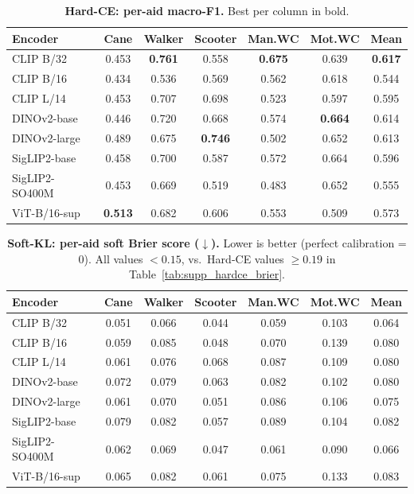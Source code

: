 \documentclass[conference]{IEEEtran}
\begin{document}
\begin{table}[!t]
\caption{\textbf{Hard-CE: per-aid macro-F1.} Best per column in bold.}
\label{tab:supp_hardce_f1}
\centering\scriptsize
\setlength{\tabcolsep}{4pt}
\begin{tabular}{@{}lcccccc@{}}
\toprule
\textbf{Encoder} & \textbf{Cane} & \textbf{Walker} & \textbf{Scooter} & \textbf{Man.WC} & \textbf{Mot.WC} & \textbf{Mean} \\
\midrule
CLIP B/32      & 0.453 & \textbf{0.761} & 0.558 & \textbf{0.675} & 0.639 & \textbf{0.617} \\
CLIP B/16      & 0.434 & 0.536 & 0.569 & 0.562 & 0.618 & 0.544 \\
CLIP L/14      & 0.453 & 0.707 & 0.698 & 0.523 & 0.597 & 0.595 \\
DINOv2-base    & 0.446 & 0.720 & 0.668 & 0.574 & \textbf{0.664} & 0.614 \\
DINOv2-large   & 0.489 & 0.675 & \textbf{0.746} & 0.502 & 0.652 & 0.613 \\
SigLIP2-base   & 0.458 & 0.700 & 0.587 & 0.572 & 0.664 & 0.596 \\
SigLIP2-SO400M & 0.453 & 0.669 & 0.519 & 0.483 & 0.652 & 0.555 \\
ViT-B/16-sup   & \textbf{0.513} & 0.682 & 0.606 & 0.553 & 0.509 & 0.573 \\
\bottomrule
\end{tabular}
\end{table}

\begin{table}[!t]
\caption{\textbf{Soft-KL: per-aid soft Brier score ($\downarrow$).} Lower is better (perfect calibration = 0). All values $<0.15$, vs.\ Hard-CE values $\geq 0.19$ in Table~\ref{tab:supp_hardce_brier}.}
\label{tab:supp_softkl_brier}
\centering\scriptsize
\setlength{\tabcolsep}{4pt}
\begin{tabular}{@{}lcccccc@{}}
\toprule
\textbf{Encoder} & \textbf{Cane} & \textbf{Walker} & \textbf{Scooter} & \textbf{Man.WC} & \textbf{Mot.WC} & \textbf{Mean} \\
\midrule
CLIP B/32      & 0.051 & 0.066 & 0.044 & 0.059 & 0.103 & 0.064 \\
CLIP B/16      & 0.059 & 0.085 & 0.048 & 0.070 & 0.139 & 0.080 \\
CLIP L/14      & 0.061 & 0.076 & 0.068 & 0.087 & 0.109 & 0.080 \\
DINOv2-base    & 0.072 & 0.079 & 0.063 & 0.082 & 0.102 & 0.080 \\
DINOv2-large   & 0.061 & 0.070 & 0.051 & 0.086 & 0.106 & 0.075 \\
SigLIP2-base   & 0.079 & 0.082 & 0.057 & 0.089 & 0.104 & 0.082 \\
SigLIP2-SO400M & 0.062 & 0.069 & 0.047 & 0.061 & 0.090 & 0.066 \\
ViT-B/16-sup   & 0.065 & 0.082 & 0.061 & 0.075 & 0.133 & 0.083 \\
\bottomrule
\end{tabular}
\end{table}
\end{document}
